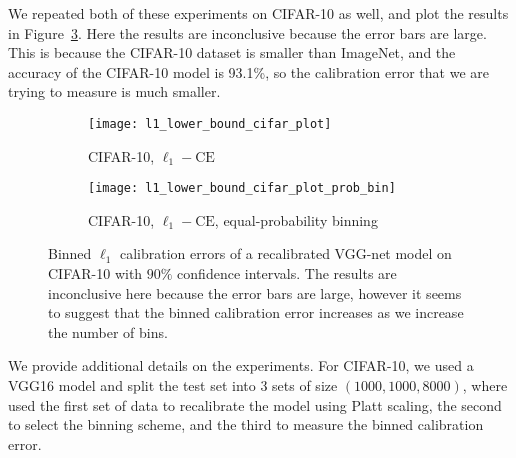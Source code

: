 We repeated both of these experiments on CIFAR-10 as well, and plot the results in Figure~\ref{fig:lower_bounds_l1_cifar}. Here the results are inconclusive because the error bars are large. This is because the CIFAR-10 dataset is smaller than ImageNet, and the accuracy of the CIFAR-10 model is 93.1\%, so the calibration error that we are trying to measure is much smaller.

\begin{figure}
     \centering
     \begin{subfigure}[b]{0.45\textwidth}
         \centering
         \texttt{[image: l1\_lower\_bound\_cifar\_plot]}
         \caption{CIFAR-10, $\ell_1-\mbox{CE}$}
         \label{fig:cifar_lower_bound_l1}
     \end{subfigure}
     \hfill
     \begin{subfigure}[b]{0.45\textwidth}
         \centering
         \texttt{[image: l1\_lower\_bound\_cifar\_plot\_prob\_bin]}
         \caption{CIFAR-10, $\ell_1-\mbox{CE}$, equal-probability binning}
         \label{fig:cifar_lower_bound_l1_prob}
     \end{subfigure}
        \caption{
        Binned $\ell_1$ calibration errors of a recalibrated VGG-net model on CIFAR-10 with $90\%$ confidence intervals. The results are inconclusive here because the error bars are large, however it seems to suggest that the binned calibration error increases as we increase the number of bins.
        }
        \label{fig:lower_bounds_l1_cifar}
\end{figure}

We provide additional details on the experiments. For CIFAR-10, we used a VGG16 model and split the test set into 3 sets of size $(1000, 1000, 8000)$, where used the first set of data to recalibrate the model using Platt scaling, the second to select the binning scheme, and the third to measure the binned calibration error.
